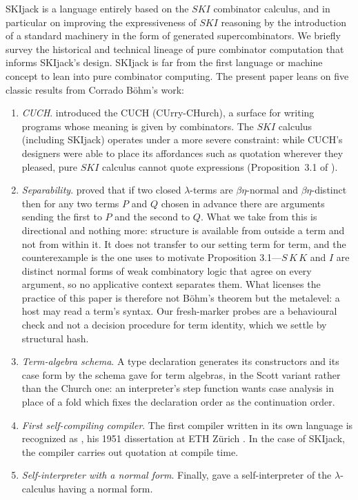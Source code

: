\documentclass[english,submission,code=tt]{programming}
\begin{document}
SKIjack is a language entirely based on the $SKI$ combinator calculus,
and in particular on improving the expressiveness of $SKI$ reasoning by
the introduction of a standard machinery in the form of generated
supercombinators.  We briefly survey the historical and technical 
lineage of pure combinator computation that informs SKIjack's design.  
SKIjack is far from the first language or machine concept to lean into
pure combinator computing.  The present paper leans on five classic 
results from Corrado B\"ohm's work:
\begin{enumerate}[nosep]
  \item  \emph{CUCH}.  \citet{BohmGross1966} introduced the CUCH 
  (CUrry-CHurch), a surface for writing programs whose meaning is given 
  by combinators.  The $SKI$ calculus (including SKIjack) operates 
  under a more severe constraint:  while CUCH's designers were able to 
  place its affordances such as quotation wherever they pleased, pure 
  $SKI$ calculus cannot quote expressions (Proposition~3.1 of
  \citet{Davis2027}).
  \item  \emph{Separability}.  \citet{Bohm1968} proved that if two 
  closed $\lambda$-terms are $\beta\eta$-normal and $\beta\eta$-distinct 
  then for any two terms $P$ and $Q$ chosen in advance there are 
  arguments sending the first to $P$ and the second to $Q$.  What we 
  take from this is directional and nothing more: structure is 
  available from outside a term and not from within it.  It does not 
  transfer to our setting term for term, and the counterexample is the 
  one \citet{Davis2027} uses to motivate Proposition 3.1---$S\,K\,K$ 
  and $I$ are distinct normal forms of weak combinatory logic that 
  agree on every argument, so no applicative context separates them.  
  What licenses the practice of this paper is therefore not Böhm's 
  theorem but the metalevel: a host may read a term's syntax.  Our 
  fresh-marker probes are a behavioural check and not a decision 
  procedure for term identity, which we settle by structural hash.
  \item  \emph{Term-algebra schema}.  A type declaration generates its 
  constructors and its case form by the schema
  \citet{BohmBerarducci1985} gave for term algebras, in the Scott 
  variant \citep{Scott1962,Jansen2013} rather than the Church one:  an 
  interpreter's step function wants case analysis in place of a fold 
  which fixes the declaration order as the continuation order.
  \item  \emph{First self-compiling compiler}.  The first compiler 
  written in its own language is recognized as \citet{Bohm1954}, his 
  1951 dissertation at ETH Z\"urich \citep{KnuthPardo1980}.  In the 
  case of SKIjack, the compiler carries out quotation at compile time.
  \item  \emph{Self-interpreter with a normal form}.  Finally,
  \citet{BerarducciBohm1993} gave a self-interpreter of the 
  $\lambda$-calculus having a normal form.  
\end{enumerate}
\end{document}
